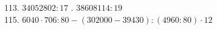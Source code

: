 113. $34052802 : 17$ . $38608114 : 19$ \\ 115. $6040 \cdot 706 : 80 - (302000 - 39430) : (4960 : 80) \cdot 12$\\
